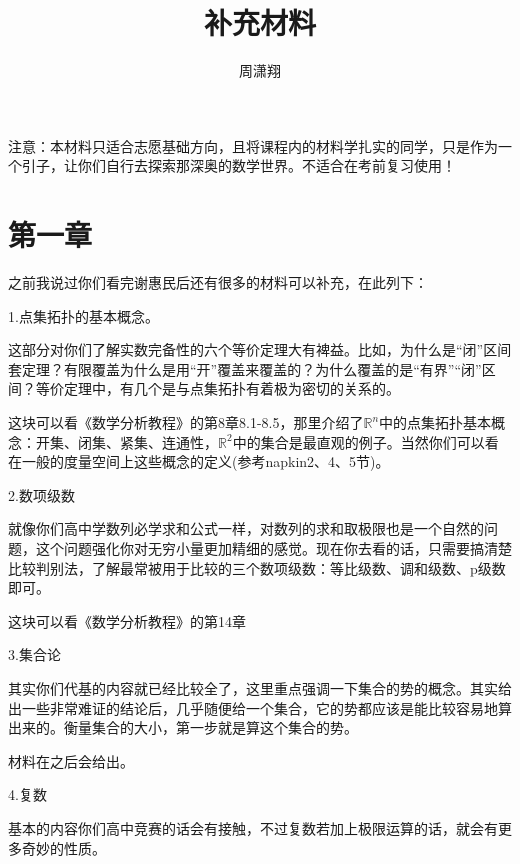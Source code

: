 \documentclass{ctexart}
\begin{document}
	
	\title{补充材料} %
	
	\author{周潇翔} %
	
	
	
	\maketitle %
	
	注意：本材料只适合志愿基础方向，且将课程内的材料学扎实的同学，只是作为一个引子，让你们自行去探索那深奥的数学世界。不适合在考前复习使用！
	
	
\section{第一章}
		
之前我说过你们看完谢惠民后还有很多的材料可以补充，在此列下：

1.点集拓扑的基本概念。

这部分对你们了解实数完备性的六个等价定理大有裨益。比如，为什么是“闭”区间套定理？有限覆盖为什么是用“开”覆盖来覆盖的？为什么覆盖的是“有界”“闭”区间？等价定理中，有几个是与点集拓扑有着极为密切的关系的。

这块可以看《数学分析教程》的第8章8.1-8.5，那里介绍了$\mathbb{R}^n$中的点集拓扑基本概念：开集、闭集、紧集、连通性，$\mathbb{R}^2$中的集合是最直观的例子。当然你们可以看在一般的度量空间上这些概念的定义(参考napkin2、4、5节)。

2.数项级数

就像你们高中学数列必学求和公式一样，对数列的求和取极限也是一个自然的问题，这个问题强化你对无穷小量更加精细的感觉。现在你去看的话，只需要搞清楚比较判别法，了解最常被用于比较的三个数项级数：等比级数、调和级数、p级数即可。

这块可以看《数学分析教程》的第14章

3.集合论

其实你们代基的内容就已经比较全了，这里重点强调一下集合的势的概念。其实给出一些非常难证的结论后，几乎随便给一个集合，它的势都应该是能比较容易地算出来的。衡量集合的大小，第一步就是算这个集合的势。

材料在之后会给出。

4.复数

基本的内容你们高中竞赛的话会有接触，不过复数若加上极限运算的话，就会有更多奇妙的性质。
\end{document}

